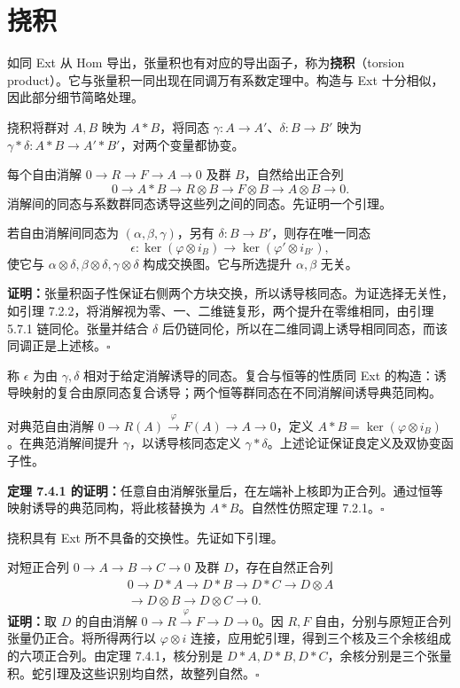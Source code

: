 \section{挠积}
如同 Ext 从 Hom 导出，张量积也有对应的导出函子，称为\textbf{挠积}（torsion product）。它与张量积一同出现在同调万有系数定理中。构造与 Ext 十分相似，因此部分细节简略处理。

挠积将群对 $A,B$ 映为 $A*B$，将同态 $\gamma:A\to A'$、$\delta:B\to B'$ 映为 $\gamma*\delta:A*B\to A'*B'$，对两个变量都协变。

每个自由消解 $0\to R\to F\to A\to0$ 及群 $B$，自然给出正合列
\[
0\to A*B\to R\otimes B\to F\otimes B\to A\otimes B\to0.
\]
消解间的同态与系数群同态诱导这些列之间的同态。先证明一个引理。

若自由消解间同态为 $(\alpha,\beta,\gamma)$，另有 $\delta:B\to B'$，则存在唯一同态
\[
\epsilon:\ker(\varphi\otimes i_B)\to\ker(\varphi'\otimes i_{B'}),
\]
使它与 $\alpha\otimes\delta,\beta\otimes\delta,\gamma\otimes\delta$ 构成交换图。它与所选提升 $\alpha,\beta$ 无关。

\textbf{证明：}张量积函子性保证右侧两个方块交换，所以诱导核同态。为证选择无关性，如引理 7.2.2，将消解视为零、一、二维链复形，两个提升在零维相同，由引理 5.7.1 链同伦。张量并结合 $\delta$ 后仍链同伦，所以在二维同调上诱导相同同态，而该同调正是上述核。\hfill$\square$

称 $\epsilon$ 为由 $\gamma,\delta$ 相对于给定消解诱导的同态。复合与恒等的性质同 Ext 的构造：诱导映射的复合由原同态复合诱导；两个恒等群同态在不同消解间诱导典范同构。

对典范自由消解 $0\to R(A)\xrightarrow{\varphi}F(A)\to A\to0$，定义 $A*B=\ker(\varphi\otimes i_B)$。在典范消解间提升 $\gamma$，以诱导核同态定义 $\gamma*\delta$。上述论证保证良定义及双协变函子性。

\textbf{定理 7.4.1 的证明：}任意自由消解张量后，在左端补上核即为正合列。通过恒等映射诱导的典范同构，将此核替换为 $A*B$。自然性仿照定理 7.2.1。\hfill$\square$

挠积具有 Ext 所不具备的交换性。先证如下引理。

对短正合列 $0\to A\to B\to C\to0$ 及群 $D$，存在自然正合列
\[
\begin{split}
0\to D*A\to D*B\to D*C\to D\otimes A\\
\to D\otimes B\to D\otimes C\to0.
\end{split}
\]
\textbf{证明：}取 $D$ 的自由消解 $0\to R\xrightarrow{\varphi}F\to D\to0$。因 $R,F$ 自由，分别与原短正合列张量仍正合。将所得两行以 $\varphi\otimes i$ 连接，应用蛇引理，得到三个核及三个余核组成的六项正合列。由定理 7.4.1，核分别是 $D*A,D*B,D*C$，余核分别是三个张量积。蛇引理及这些识别均自然，故整列自然。\hfill$\square$

